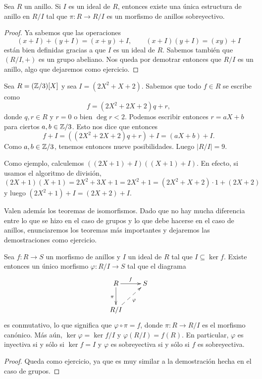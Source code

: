 \begin{theorem}
Sea $R$ un anillo. Si $I$ es un ideal de $R$, entonces existe una 
única estructura de anillo en $R/I$ tal que
$\pi\colon R\to R/I$ es un morfismo de anillos sobreyectivo. 	
\end{theorem}

\begin{proof}
Ya sabemos que las operaciones
\[
(x+I)+(y+I)=(x+y)+I,\qquad(x+I)(y+I)=(xy)+I
\]
están bien definidas gracias a que $I$ es un ideal de $R$. Sabemos también que 
$(R/I,+)$ es un grupo abeliano. Nos queda por demotrar entonces que $R/I$ es un anillo, algo que dejaremos como ejercicio.
\end{proof}

\begin{example}
Sea $R=(\mathbb{Z}/3)[X]$ y sea $I=(2X^2+X+2)$. Sabemos que todo $f\in R$ se escribe como 
\[
f=(2X^2+2X+2)q+r,
\]
donde $q,r\in R$ y $r=0$ o bien $\deg r<2$. Podemos escribir entonces $r=aX+b$ para ciertos $a,b\in\mathbb{Z}/3$. Esto
nos dice que entonces
\[
f+I=( (2X^2+2X+2)q+r)+I=(aX+b)+I.
\]	
Como $a,b\in\mathbb{Z}/3$, tenemos entonces nueve posibilidades. Luego $|R/I|=9$. 

Como ejemplo, calculemos $( (2X+1)+I)( (X+1)+I)$. En efecto, si usamos el algoritmo de división, 
\[
(2X+1)(X+1)=2X^2+3X+1=2X^2+1=(2X^2+X+2)\cdot 1+(2X+2)
\]
y luego $(2X^2+1)+I=(2X+2)+I$. 
\end{example}

Valen además los teoremas de isomorfismos. Dado que no hay mucha diferencia entre lo que se hizo en el caso de grupos y lo que debe hacerse en el caso de anillos, 
enunciaremos los teoremas más importantes y dejaremos las demostraciones como ejercicio. 

\begin{theorem}
Sea $f\colon R\to S$ un morfismo de anillos y $I$ un ideal de $R$ tal que $I\subseteq\ker f$. Existe entonces
un único morfismo $\varphi\colon R/I\to S$ tal que el diagrama
\[
        \xymatrix{
        R
        \ar[d]_\pi
        \ar[r]^f
        & S
        \\
        R/I\ar@{-->}[ur]_{\varphi}
        }
\]
es conmutativo, lo que significa que $\varphi\circ\pi=f$, donde $\pi\colon R\to R/I$ es el morfismo canónico. 
Más aún, $\ker\varphi=\ker f/I$ 
y $\varphi(R/I)=f(R)$. En particular, $\varphi$ es inyectiva si y sólo si $\ker f=I$ y $\varphi$ es sobreyectiva si y sólo si $f$ es sobreyectiva. 
\end{theorem}

\begin{proof}
Queda como ejercicio, ya que es muy similar a la demostración hecha en el caso de grupos.
\end{proof}


